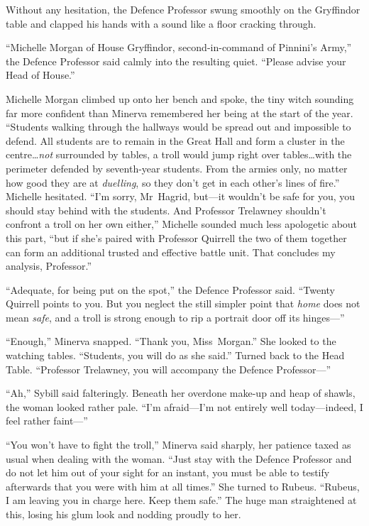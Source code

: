 Without any hesitation, the Defence Professor swung smoothly on the Gryffindor table and clapped his hands with a sound like a floor cracking through.

“Michelle Morgan of House Gryffindor, second-in-command of Pinnini’s Army,” the Defence Professor said calmly into the resulting quiet. “Please advise your Head of House.”

Michelle Morgan climbed up onto her bench and spoke, the tiny witch sounding far more confident than Minerva remembered her being at the start of the year. “Students walking through the hallways would be spread out and impossible to defend. All students are to remain in the Great Hall and form a cluster in the centre…\emph{not} surrounded by tables, a troll would jump right over tables…with the perimeter defended by seventh-year students. From the armies only, no matter how good they are at \emph{duelling}, so they don’t get in each other’s lines of fire.” Michelle hesitated. “I’m sorry, Mr~Hagrid, but—it wouldn’t be safe for you, you should stay behind with the students. And Professor Trelawney shouldn’t confront a troll on her own either,” Michelle sounded much less apologetic about this part, “but if she’s paired with Professor Quirrell the two of them together can form an additional trusted and effective battle unit. That concludes my analysis, Professor.”

“Adequate, for being put on the spot,” the Defence Professor said. “Twenty Quirrell points to you. But you neglect the still simpler point that \emph{home} does not mean \emph{safe}, and a troll is strong enough to rip a portrait door off its hinges—”

“Enough,” Minerva snapped. “Thank you, Miss~Morgan.” She looked to the watching tables. “Students, you will do as she said.” Turned back to the Head Table. “Professor Trelawney, you will accompany the Defence Professor—”

“Ah,” Sybill said falteringly. Beneath her overdone make-up and heap of shawls, the woman looked rather pale. “I’m afraid—I’m not entirely well today—indeed, I feel rather faint—”

“You won’t have to fight the troll,” Minerva said sharply, her patience taxed as usual when dealing with the woman. “Just stay with the Defence Professor and do not let him out of your sight for an instant, you must be able to testify afterwards that you were with him at all times.” She turned to Rubeus. “Rubeus, I am leaving you in charge here. Keep them safe.” The huge man straightened at this, losing his glum look and nodding proudly to her.


